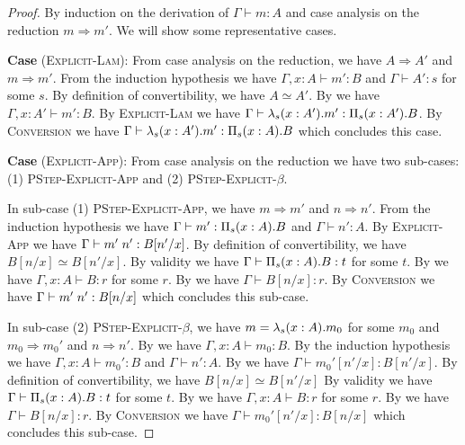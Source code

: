 \begin{proof}
  By induction on the derivation of $\Gamma \vdash m : A$ and case analysis on the reduction $m \Rightarrow m'$.
  We will show some representative cases.

\textbf{Case} (\textsc{Explicit-Lam}):
  From case analysis on the reduction, we have $A \Rightarrow A'$ and $m \Rightarrow m'$.
  From the induction hypothesis we have $\Gamma, x : A \vdash m' : B$ and $\Gamma \vdash A' : s$ for some $s$.
  By definition of convertibility, we have $A \simeq A'$.
  By  we have $\Gamma, x : A' \vdash m' : B$.
  By \textsc{Explicit-Lam} we have $\Gamma \vdash \lambda_{s}({x : A'}).{m'} : \Pi_{s}({x : A'}).{B}$.
  By \textsc{Conversion} we have $\Gamma \vdash \lambda_{s}({x : A'}).{m'} : \Pi_{s}({x : A}).{B}$ which concludes this case.

\textbf{Case} (\textsc{Explicit-App}):
  From case analysis on the reduction we have two sub-cases:
  (1) \textsc{PStep-Explicit-App} and (2) \textsc{PStep-Explicit-$\beta$}.

  In sub-case (1) \textsc{PStep-Explicit-App}, we have $m \Rightarrow m'$ and $n \Rightarrow n'$.
  From the induction hypothesis we have $\Gamma \vdash m' : \Pi_{s}({x : A}).{B}$ and $\Gamma \vdash n' : A$.
  By \textsc{Explicit-App} we have $\Gamma \vdash {m'}\;{n'} : B[n'/x]$.
  By definition of convertibility, we have $B[n/x] \simeq B[n'/x]$.
  By validity we have $\Gamma \vdash \Pi_{s}({x : A}).{B} : t$ for some $t$.
  By  we have $\Gamma, x : A \vdash B : r$ for some $r$.
  By  we have $\Gamma \vdash B[n/x] : r$.
  By \textsc{Conversion} we have $\Gamma \vdash {m'}\;{n'} : B[n/x]$ which concludes this sub-case.

  In sub-case (2) \textsc{PStep-Explicit-$\beta$}, we have $m = \lambda_{s}({x : A}).{m_0}$ for some $m_0$
  and $m_0 \Rightarrow m_0'$ and $n \Rightarrow n'$.
  By  we have $\Gamma, x : A \vdash m_0 : B$.
  By the induction hypothesis we have $\Gamma, x : A \vdash m_0' : B$ and $\Gamma \vdash n' : A$.
  By  we have $\Gamma \vdash m_0'[n'/x] : B[n'/x]$.
  By definition of convertibility, we have $B[n/x] \simeq B[n'/x]$
  By validity we have $\Gamma \vdash \Pi_{s}({x : A}).{B} : t$ for some $t$.
  By  we have $\Gamma, x : A \vdash B : r$ for some $r$.
  By  we have $\Gamma \vdash B[n/x] : r$.
  By \textsc{Conversion} we have $\Gamma \vdash m_0'[n'/x] : B[n/x]$ which concludes this sub-case.


\end{proof}
